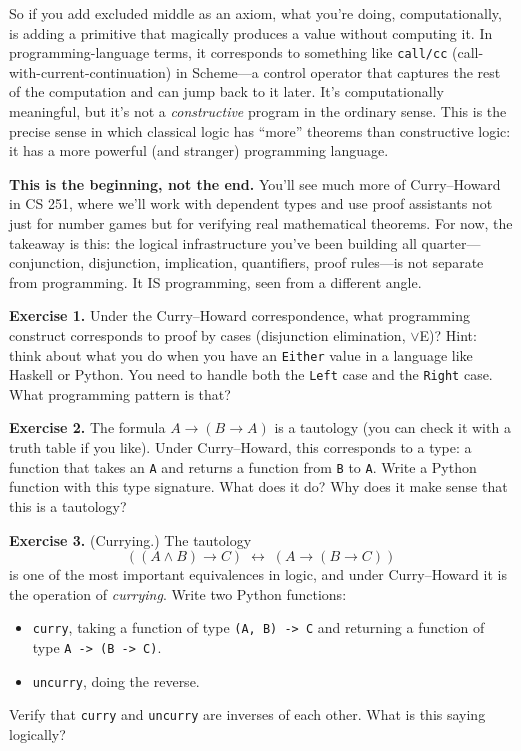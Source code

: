 \documentclass[11pt]{article}
\begin{document}
So if you add excluded middle as an axiom, what you're doing, computationally, is adding a primitive that magically produces a value without computing it. In programming-language terms, it corresponds to something like \texttt{call/cc} (call-with-current-continuation) in Scheme---a control operator that captures the rest of the computation and can jump back to it later. It's computationally meaningful, but it's not a \emph{constructive} program in the ordinary sense. This is the precise sense in which classical logic has ``more'' theorems than constructive logic: it has a more powerful (and stranger) programming language.

\textbf{This is the beginning, not the end.} You'll see much more of Curry--Howard in CS 251, where we'll work with dependent types and use proof assistants not just for number games but for verifying real mathematical theorems. For now, the takeaway is this: the logical infrastructure you've been building all quarter---conjunction, disjunction, implication, quantifiers, proof rules---is not separate from programming. It IS programming, seen from a different angle.

\bigskip
\textbf{Exercise 1.}\label{ex:ch:1} Under the Curry--Howard correspondence, what programming construct corresponds to proof by cases (disjunction elimination, $\vee$E)? Hint: think about what you do when you have an \texttt{Either} value in a language like Haskell or Python. You need to handle both the \texttt{Left} case and the \texttt{Right} case. What programming pattern is that?

\bigskip
\textbf{Exercise 2.}\label{ex:ch:2} The formula $A \to (B \to A)$ is a tautology (you can check it with a truth table if you like). Under Curry--Howard, this corresponds to a type: a function that takes an \texttt{A} and returns a function from \texttt{B} to \texttt{A}. Write a Python function with this type signature. What does it do? Why does it make sense that this is a tautology?

\bigskip
\textbf{Exercise 3.}\label{ex:ch:3} (Currying.) The tautology
\[
  ((A \wedge B) \to C) \;\leftrightarrow\; (A \to (B \to C))
\]
is one of the most important equivalences in logic, and under Curry--Howard it is the operation of \emph{currying}. Write two Python functions:
\begin{itemize}
  \item \texttt{curry}, taking a function of type \texttt{(A,~B) -> C} and returning a function of type \texttt{A -> (B -> C)}.
  \item \texttt{uncurry}, doing the reverse.
\end{itemize}
Verify that \texttt{curry} and \texttt{uncurry} are inverses of each other. What is this saying logically?
\end{document}
